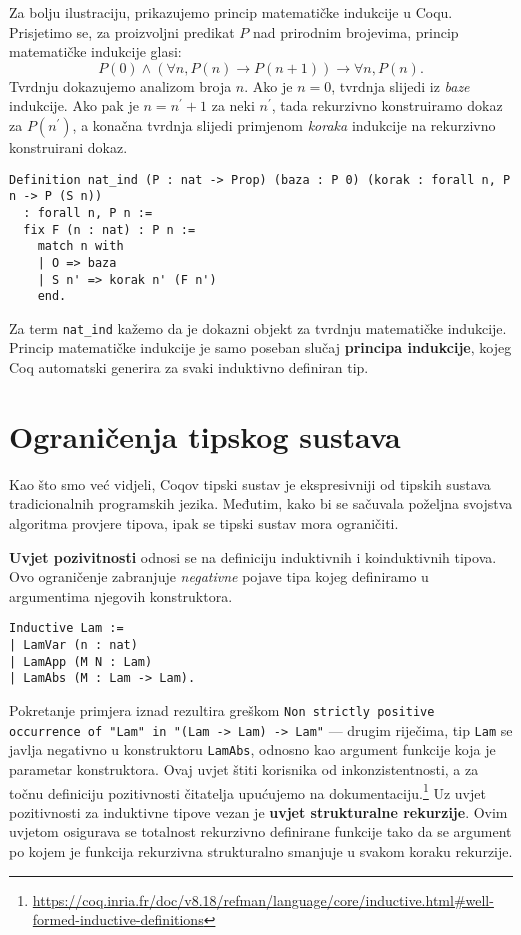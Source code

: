 Za bolju ilustraciju, prikazujemo princip matematičke indukcije u Coqu.
Prisjetimo se, za proizvoljni predikat \(P\) nad prirodnim brojevima, princip matematičke indukcije glasi:
\[
  P(0) \land (\forall n, P(n) \rightarrow P(n + 1)) \rightarrow \forall n, P(n).
\]
\noindent Tvrdnju dokazujemo analizom broja \(n\).
Ako je \(n = 0\), tvrdnja slijedi iz \textit{baze} indukcije.
Ako pak je \(n = n^{\prime} + 1\) za neki \(n^{\prime}\), tada rekurzivno konstruiramo dokaz za \(P(n^{\prime})\), a konačna tvrdnja slijedi primjenom \textit{koraka} indukcije na rekurzivno konstruirani dokaz.
\begin{verbatim}
Definition nat_ind (P : nat -> Prop) (baza : P 0) (korak : forall n, P n -> P (S n))
  : forall n, P n :=
  fix F (n : nat) : P n :=
    match n with
    | O => baza
    | S n' => korak n' (F n')
    end.
\end{verbatim}
Za term \texttt{nat\_ind} kažemo da je dokazni objekt  za tvrdnju matematičke indukcije.
Princip matematičke indukcije je samo poseban slučaj \textbf{principa indukcije}, kojeg Coq automatski generira za svaki induktivno definiran tip.

\section{Ograničenja tipskog sustava}\label{sec:ogranicenja}
Kao što smo već vidjeli, Coqov tipski sustav je ekspresivniji od tipskih sustava tradicionalnih programskih jezika.
Međutim, kako bi se sačuvala poželjna svojstva algoritma provjere tipova, ipak se tipski sustav mora ograničiti.

\textbf{Uvjet pozivitnosti} odnosi se na definiciju induktivnih i koinduktivnih tipova.
Ovo ograničenje zabranjuje \textit{negativne} pojave tipa kojeg definiramo u argumentima njegovih konstruktora.
\begin{verbatim}
Inductive Lam :=
| LamVar (n : nat)
| LamApp (M N : Lam)
| LamAbs (M : Lam -> Lam).
\end{verbatim}
\noindent Pokretanje primjera iznad rezultira greškom \texttt{Non strictly positive occurrence of "Lam" in "(Lam -> Lam) -> Lam"} ---
drugim riječima, tip \texttt{Lam} se javlja negativno u konstruktoru \texttt{LamAbs}, odnosno kao argument funkcije koja je parametar konstruktora.
Ovaj uvjet štiti korisnika od inkonzistentnosti, a za točnu definiciju pozitivnosti čitatelja upućujemo na dokumentaciju.\footnote{\url{https://coq.inria.fr/doc/v8.18/refman/language/core/inductive.html\#well-formed-inductive-definitions}}
Uz uvjet pozitivnosti za induktivne tipove vezan je \textbf{uvjet strukturalne rekurzije}.
Ovim uvjetom osigurava se totalnost rekurzivno definirane funkcije
tako da se argument po kojem je funkcija rekurzivna strukturalno smanjuje u svakom koraku rekurzije.

